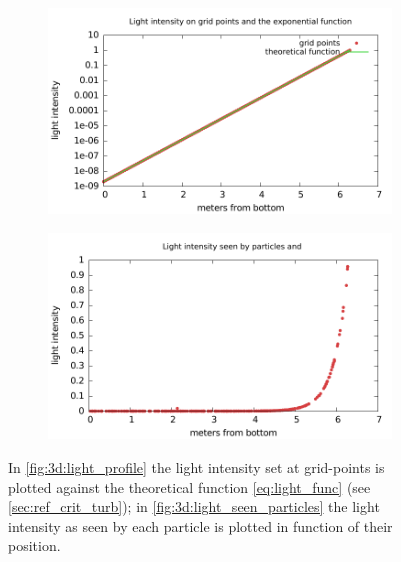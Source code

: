 \begin{figure} 
  \centering
  \begin{subfigure}[b]{\textwidth}
    \includegraphics[width=\textwidth]{data/3D_model/light_profile}
    \caption{}
    \label{fig:3d:light_profile}
  \end{subfigure}
  \begin{subfigure}[b]{\textwidth}
    \includegraphics[width=\textwidth]{data/3D_model/light_seen_particle}
    \caption{}
    \label{fig:3d:light_seen_particles}
  \end{subfigure}
    \caption{In \autoref{fig:3d:light_profile} the light intensity set at grid-points is plotted against the theoretical function \autoref{eq:light_func} (see \autoref{sec:ref_crit_turb}); in \autoref{fig:3d:light_seen_particles} the light intensity as seen by each particle is plotted in function of their position.}
    \label{fig:3d_light_A}
\end{figure}
